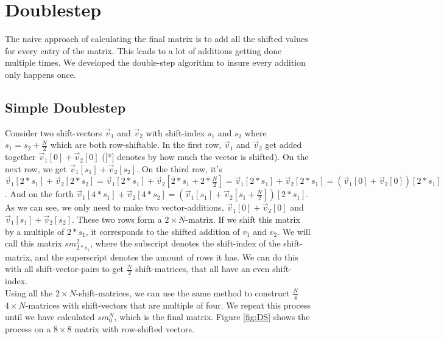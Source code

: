 \documentclass[12pt]{article}
\begin{document}
\section{ Doublestep }

The naive approach of calculating the final matrix is to add all the shifted values for every entry of the matrix. This leads to a lot of additions getting done multiple times. We developed the double-step algorithm to insure every addition only happens once.

\subsection{ Simple Doublestep }

Consider two shift-vectors $\vec{v}_1$ and $\vec{v}_2$ with shift-index $s_1$ and $s_2$ where $s_1 = s_2+\frac{N}{2}$ which are both row-shiftable. In the first row, $\vec{v}_1$ and $\vec{v}_2$ get added together $\vec{v}_1[0]+\vec{v}_2[0]$ ([*] denotes by how much the vector is shifted). On the next row, we get $\vec{v}_1[s_1]+\vec{v}_2[s_2]$. On the third row, it's $\vec{v}_1[2*s_1]+\vec{v}_2[2*s_2] = \vec{v}_1[2*s_1]+\vec{v}_2[2*s_1+2*\frac{N}{2}] = \vec{v}_1[2*s_1]+\vec{v}_2[2*s_1] = (\vec{v}_1[0]+\vec{v}_2[0])[2*s_1] $. And on the forth $\vec{v}_1[4*s_1]+\vec{v}_2[4*s_2] = (\vec{v}_1[s_1]+\vec{v}_2[s_1 +\frac{N}{2}])[2*s_1]$.\\

As we can see, we only need to make two vector-additions, $\vec{v}_1[0]+\vec{v}_2[0]$ and $\vec{v}_1[s_1]+\vec{v}_2[s_2]$. These two rows form a $2\times N$-matrix. If we shift this matrix by a multiple of $2*s_1$, it corresponds to the shifted addition of $v_1$ and $v_2$. We will call this matrix $sm_{2*s_1}^2$, where the subscript denotes the shift-index of the shift-matrix, and the superscript denotes the amount of rows it has. We can do this with all shift-vector-pairs to get $\frac{N}{2}$ shift-matrices, that all have an even shift-index.\\

Using all the $2\times N$-shift-matrices, we can use the same method to construct $\frac{N}{4}$ $4\times N$-matrices with shift-vectors that are multiple of four. We repeat this process until we have calculated $sm_{0}^N$, which is the final matrix. Figure \ref{fig:DS} shows the process on a $8\times 8$ matrix with row-shifted vectors.
\end{document}
